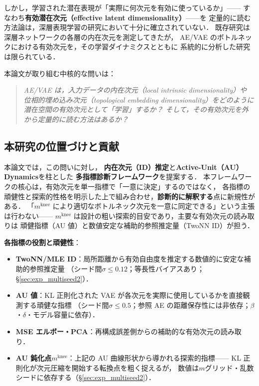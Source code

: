 \documentclass[11pt,a4paper]{jsarticle}
\newcommand{\mknee}{m^{\mathrm{knee}}}
\begin{document}
しかし，学習された潜在表現が「実際に何次元を有効に使っているか」——
すなわち\textbf{有効潜在次元（effective latent dimensionality）}——を
定量的に読む方法論は，深層表現学習の研究において十分に確立されていない．
既存研究\cite{ansuini2019intrinsic,valeriani2023geometry}は
深層ネットワークの各層の内在次元を測定してきたが，
AE/VAE のボトルネックにおける有効次元を，その学習ダイナミクスとともに
系統的に分析した研究は限られている．

本論文が取り組む中核的な問いは：
\begin{quote}
\textit{AE/VAE は，入力データの内在次元（local intrinsic dimensionality）や
位相的埋め込み次元（topological embedding dimensionality）をどのように
潜在空間の有効次元として「学習」するか？
そして，その有効次元を外から定量的に読む方法はあるか？}
\end{quote}

\subsection{本研究の位置づけと貢献}\label{sec:intro_aim}

本論文では，この問いに対し，
\textbf{内在次元（ID）推定}と\textbf{Active-Unit（AU）Dynamics}を柱とした
\textbf{多指標診断フレームワーク}を提案する．
本フレームワークの核心は，有効次元を単一指標で「一意に決定」するのではなく，
各指標の頑健性と探索的性格を明示した上で組み合わせ，\textbf{診断的に解釈する}点に新規性がある．
「$\mknee$ により適切なボトルネック次元を一意に同定できる」という主張は行わない——
$\mknee$ は設計の粗い探索的目安であり，主要な有効次元の読み取りは
頑健指標（AU 値）と数値安定な補助的参照推定量（TwoNN ID）が担う．

\textbf{各指標の役割と頑健性}：
\begin{itemize}
  \item \textbf{TwoNN/MLE ID}：局所距離から有効自由度を推定する数値的に安定な補助的参照推定量
        （シード間$\sigma \leq 0.12$；等長性バイアスあり；§\ref{sec:exp_multiseed2}）．
  \item \textbf{AU 値}：KL 正則化された VAE が各次元を実際に使用しているかを直接観測する頑健な指標
        （シード間$\sigma \leq 0.5$；参照 AE の距離保存性には非依存；$\beta$・$\delta$・モデル容量に依存）．
  \item \textbf{MSE エルボー・PCA}：再構成誤差側からの補助的な有効次元の読み取り．
  \item \textbf{AU 鈍化点$\mknee$}：上記の AU 曲線形状から導かれる探索的指標——
        KL 正則化が次元圧縮を開始する転換点を粗く捉えるが，
        数値は$m$グリッド・乱数シードに依存する（§\ref{sec:exp_multiseed2}）．
\end{itemize}
\end{document}
